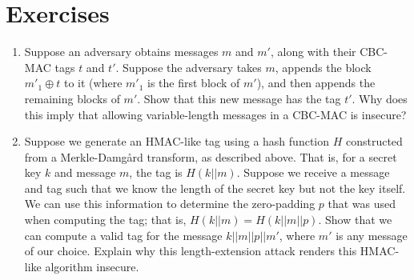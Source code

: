\documentclass{book}
\theoremstyle{plain}
\theoremstyle{definition}
\newif\ifprintsolutions
\newcommand{\solution}[1]{\ifprintsolutions \begin{sloppypar}{\it #1}\end{sloppypar} \fi} %
\begin{document}
\section{Exercises}
\begin{enumerate}
\item Suppose an adversary obtains messages $m$ and $m'$, along with their CBC-MAC tags $t$ and $t'$. Suppose the adversary takes $m$, appends the block $m'_1 \oplus t$ to it (where $m'_1$ is the first block of $m'$), and then appends the remaining blocks of $m'$. Show that this new message has the tag $t'$. Why does this imply that allowing variable-length messages in a CBC-MAC is insecure? \solution{After we have computed the tag $t$ for message $m$, the next block cipher input is $t \oplus (m_1' \oplus t) = m_1'$. The algorithm continues as if the original message $m$ were not present, and outputs the tag $t'$ for this new message.}
\item Suppose we generate an HMAC-like tag using a hash function $H$ constructed from a Merkle-Damg\r{a}rd transform, as described above. That is, for a secret key $k$ and message $m$, the tag is $H(k||m)$. Suppose we receive a message and tag such that we know the length of the secret key but not the key itself. We can use this information to determine the zero-padding $p$ that was used when computing the tag; that is, $H(k||m) = H(k||m||p)$. Show that we can compute a valid tag for the message $k||m||p||m'$, where $m'$ is any message of our choice. Explain why this length-extension attack renders this HMAC-like algorithm insecure. \solution{When computing the tag for the new message $k||m||p||m'$, we simply use the tag for the message $k||m||p$, along with the first block of $m'$, as the input for the next stage in the transform $H$. The result is a valid tag for a new message without knowing $k$, so this scheme is insecure.}
\end{enumerate}

\appendix
\end{document}
